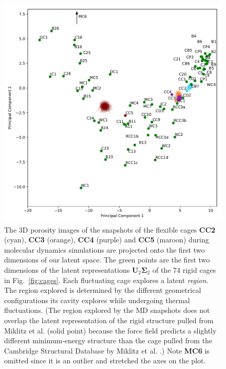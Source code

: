 \documentclass[journal=jacsat,manuscript=article]{achemso}
\begin{document}
{\begin{figure}
\centering
	\includegraphics[width=\columnwidth]{../PCA_latent_cage_space_with_flexible_cages_2D.pdf}
	\caption{\color{red}The 3D porosity images of the snapshots of the flexible cages \textbf{CC2} (cyan), \textbf{CC3} (orange), \textbf{CC4} (purple) and \textbf{CC5} (maroon) during molecular dynamics simulations are projected onto the first two dimensions of our latent space. The green points are the first two dimensions of the latent representations $\mathbf{U}_2\mathbf{\Sigma}_2$ of the 74 rigid cages in Fig.~\ref{fig:cages}. Each fluctuating cage explores a latent \emph{region}. The region explored is determined by the different geometrical configurations its cavity explores while undergoing thermal fluctuations. (The region explored by the MD snapshots does not overlap the latent representation of the rigid structure pulled from Miklitz et al. \cite{miklitz2017computational} (solid point) because the force field predicts a slightly different minimum-energy structure than the cage pulled from the Cambridge Structural Database by Miklitz et al. \cite{miklitz2017computational}.) Note \textbf{MC6} is omitted since it is an outlier and stretched the axes on the plot. 
	} \label{fig:pca_space_with_flex}
\end{figure}

}
\end{document}
